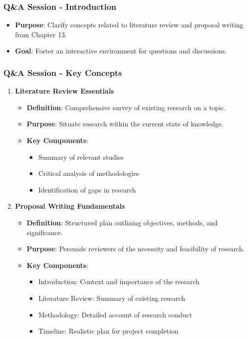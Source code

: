 \documentclass[aspectratio=169]{beamer}
\begin{document}
\begin{frame}[fragile]
    \frametitle{Q\&A Session - Introduction}
    \begin{itemize}
        \item \textbf{Purpose}: Clarify concepts related to literature review and proposal writing from Chapter 13.
        \item \textbf{Goal}: Foster an interactive environment for questions and discussions.
    \end{itemize}
\end{frame}

\begin{frame}[fragile]
    \frametitle{Q\&A Session - Key Concepts}
    \begin{enumerate}
        \item \textbf{Literature Review Essentials}
        \begin{itemize}
            \item \textbf{Definition}: Comprehensive survey of existing research on a topic.
            \item \textbf{Purpose}: Situate research within the current state of knowledge.
            \item \textbf{Key Components}:
            \begin{itemize}
                \item Summary of relevant studies
                \item Critical analysis of methodologies
                \item Identification of gaps in research
            \end{itemize}
        \end{itemize}
        
        \item \textbf{Proposal Writing Fundamentals}
        \begin{itemize}
            \item \textbf{Definition}: Structured plan outlining objectives, methods, and significance.
            \item \textbf{Purpose}: Persuade reviewers of the necessity and feasibility of research.
            \item \textbf{Key Components}:
            \begin{itemize}
                \item Introduction: Context and importance of the research
                \item Literature Review: Summary of existing research
                \item Methodology: Detailed account of research conduct
                \item Timeline: Realistic plan for project completion
            \end{itemize}
        \end{itemize}
    \end{enumerate}
\end{frame}
\end{document}
